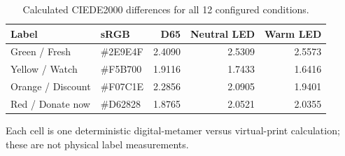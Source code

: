 \begin{table}[!t]
\caption{Calculated CIEDE2000 differences for all 12 configured conditions.}
\label{tab:deltae}\centering\small
\begin{tabular}{llrrr}
\toprule
Label & sRGB & D65 & Neutral LED & Warm LED \\
\midrule
Green / Fresh & \#2E9E4F & 2.4090 & 2.5309 & 2.5573 \\
Yellow / Watch & \#F5B700 & 1.9116 & 1.7433 & 1.6416 \\
Orange / Discount & \#F07C1E & 2.2856 & 2.0905 & 1.9401 \\
Red / Donate now & \#D62828 & 1.8765 & 2.0521 & 2.0355 \\
\bottomrule
\end{tabular}
\par\vspace{3pt}\footnotesize Each cell is one deterministic digital-metamer versus virtual-print calculation; these are not physical label measurements.
\end{table}
